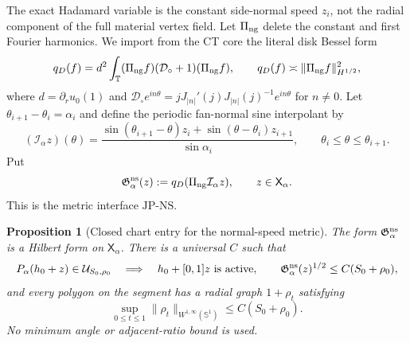 \documentclass[11pt]{amsart}
\numberwithin{equation}{section}
\newtheorem{proposition}[theorem]{Proposition}
\theoremstyle{definition}
\theoremstyle{remark}
\begin{document}
The exact Hadamard variable is the constant side-normal speed $z_i$, not
the radial component of the full material vertex field.  Let
$\Pi_{\rm ng}$ delete the constant and first Fourier harmonics.  We import
from the CT core the literal disk Bessel form
\[
 q_D(f)=d^2\int_{\mathbb T}(\Pi_{\rm ng}f)
       (\mathcal D_\circ+1)(\Pi_{\rm ng}f),
 \qquad
 q_D(f)\asymp\|\Pi_{\rm ng}f\|_{H^{1/2}}^2,
\]
where $d=\partial_ru_0(1)$ and
$\mathcal D_\circ e^{in\theta}
=jJ_{|n|}'(j)J_{|n|}(j)^{-1}e^{in\theta}$ for $n\ne0$.
Let $\theta_{i+1}-\theta_i=\alpha_i$ and define the periodic fan-normal sine
interpolant by
\begin{equation}\label{JP:eq:normal-speed-interpolant}
 (\mathcal I_\alpha z)(\theta)
 =\frac{\sin(\theta_{i+1}-\theta)z_i
         +\sin(\theta-\theta_i)z_{i+1}}{\sin\alpha_i},\qquad
 \theta_i\le\theta\le\theta_{i+1}.
\end{equation}
Put
\begin{equation}\label{JP:eq:normal-speed-metric}
 \mathfrak G_\alpha^{\rm ns}(z)
 :=q_D(\Pi_{\rm ng}\mathcal I_\alpha z),
 \qquad z\in\mathsf X_\alpha.
\end{equation}
This is the metric interface \(\mathrm{JP\text{-}NS}\).

\begin{proposition}[Closed chart entry for the normal-speed metric]
\label{JP:prop:normal-speed-chart-entry}
The form $\mathfrak G_\alpha^{\rm ns}$ is a Hilbert form on
$\mathsf X_\alpha$.  There is a universal $C$ such that
\begin{equation}\label{JP:eq:normal-speed-chart-entry}
 P_\alpha(h_0+z)\in\mathcal U_{S_0,\rho_0}
 \quad\Longrightarrow\quad
 h_0+[0,1]z\ \hbox{is active},\qquad
 \mathfrak G_\alpha^{\rm ns}(z)^{1/2}\le C(S_0+\rho_0),
\end{equation}
and every polygon on the segment has a radial graph $1+\rho_t$ satisfying
\begin{equation}\label{JP:eq:radial-path-entry}
 \sup_{0\le t\le1}\|\rho_t\|_{W^{1,\infty}(\mathbb S^1)}
 \le C(S_0+\rho_0).
\end{equation}
No minimum angle or adjacent-ratio bound is used.
\end{proposition}
\end{document}
